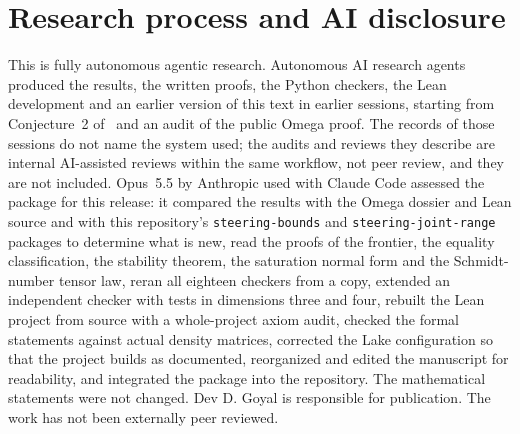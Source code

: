 \documentclass[11pt,a4paper]{article}
\theoremstyle{remark}\newtheorem{remark}[theorem]{Remark}
\begin{document}
\section{Research process and AI disclosure}\label{sec:disclosure}
This is fully autonomous agentic research. Autonomous AI research agents
produced the results, the written proofs, the Python checkers, the Lean
development and an earlier version of this text in earlier sessions,
starting from Conjecture~2 of~\cite{milne2014} and an audit of the public
Omega proof. The records of those sessions do not name the system used; the
audits and reviews they describe are internal AI-assisted reviews within the
same workflow, not peer review, and they are not included. Opus~5.5 by
Anthropic used with Claude Code assessed the package for this release: it
compared the results with the Omega dossier and Lean source and with this
repository's \texttt{steering-bounds} and \texttt{steering-joint-range}
packages to determine what is new, read the proofs of the frontier, the
equality classification, the stability theorem, the saturation normal form
and the Schmidt-number tensor law, reran all eighteen checkers from a copy,
extended an independent checker with tests in dimensions three and four,
rebuilt the Lean project from source with a whole-project axiom audit,
checked the formal statements against actual density matrices, corrected
the Lake configuration so that the project builds as documented,
reorganized and edited the manuscript for readability, and integrated the
package into the repository. The mathematical statements were not changed.
Dev D. Goyal is responsible for publication. The work has not been
externally peer reviewed.

\appendix


\end{document}
